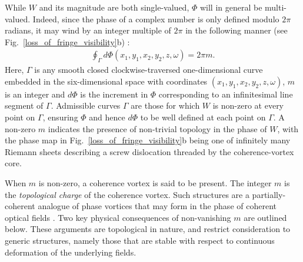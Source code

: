 \documentclass{iucr}              %
\begin{document}
While $W$ and its magnitude are both single-valued, $\Phi$ will in general be multi-valued. Indeed, since the phase of a complex number is only defined modulo $2\pi$ radians, it may wind by an integer multiple of $2\pi$ in the following manner (see Fig.~\ref{loss_of_fringe_visibility}b) \cite{GburVisser2003}: 
\begin{equation}
\begin{aligned}
\label{phase_of_W_winding}
\oint_{\Gamma} d\Phi(x_1,y_1,x_2,y_2,z,\omega)=2\pi m.
\end{aligned}
\end{equation}
Here, $\Gamma$ is any smooth closed clockwise-traversed one-dimensional curve embedded in the six-dimensional space with coordinates $(x_1,y_1,x_2,y_2,z,\omega)$, $m$ is an integer and $d\Phi$ is the increment in $\Phi$ corresponding to an infinitesimal line segment of $\Gamma$.  Admissible curves $\Gamma$ are those for which $W$ is non-zero at every point on $\Gamma$, ensuring $\Phi$ and hence $d\Phi$ to be well defined at each point on $\Gamma$.  A non-zero $m$ indicates the presence of non-trivial topology in the phase of $W$, with the phase map in Fig.~\ref{loss_of_fringe_visibility}b being one of infinitely many Riemann sheets describing a screw dislocation threaded by the coherence-vortex core. 

When $m$ is non-zero, a coherence vortex \cite{GburVisser2003} is said to be present.  The integer $m$ is the {\em topological charge} of the coherence vortex.  Such structures are a partially-coherent analogue of phase vortices that may form in the phase of coherent optical fields \cite{NyeBerry1974,Nye1999,SoskinVasnetsov2001,DennisProgOpt2009}.  Two key physical consequences of non-vanishing $m$ are outlined below.  These arguments are topological in nature, and restrict consideration to generic structures, namely those that are stable with respect to continuous deformation of the underlying fields. 
\end{document}
